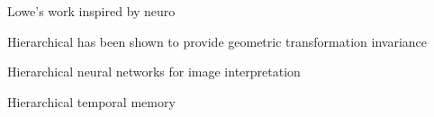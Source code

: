 Lowe's work inspired by neuro

Hierarchical has been shown to provide geometric transformation invariance

Hierarchical neural networks for image interpretation

Hierarchical temporal memory 